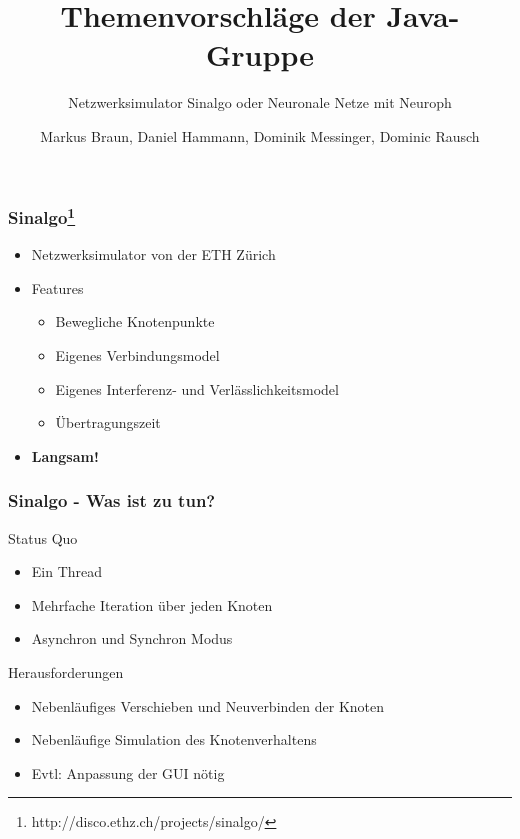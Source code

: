\documentclass[18pt]{beamer}
\title{Themenvorschläge der Java-Gruppe}
\subtitle{Netzwerksimulator Sinalgo oder Neuronale Netze mit Neuroph}
\author{Markus Braun, Daniel Hammann, Dominik Messinger, Dominic Rausch}
\institute{Institut für Programmstrukturen und Datenorganisation (IPD), Lehrstuhl für Programmiersysteme}
\begin{document}
	\maketitle

	\begin{frame}[c]\frametitle{Sinalgo\footnote{http://disco.ethz.ch/projects/sinalgo/} }
		\begin{block}{}
			\begin{itemize}
			\item Netzwerksimulator von der ETH Zürich
			\item Features
			\begin{itemize}
				\item Bewegliche Knotenpunkte
				\item Eigenes Verbindungsmodel
				\item Eigenes Interferenz- und Verlässlichkeitsmodel
				\item Übertragungszeit
			\end{itemize}
			\item \textbf{Langsam!}
			\end{itemize}
		\end{block}
	\end{frame}

	\begin{frame}[c]\frametitle{Sinalgo - Was ist zu tun?}
		\begin{block}{Status Quo}
		    \begin{itemize}
		    	\item Ein Thread
		    	\item Mehrfache Iteration über jeden Knoten
		    	\item Asynchron und Synchron Modus
		    \end{itemize}
		\end{block}
		\begin{block}{Herausforderungen}
			\begin{itemize}
		    	\item Nebenläufiges Verschieben und Neuverbinden der Knoten
		    	\item Nebenläufige Simulation des Knotenverhaltens
		    	\item Evtl: Anpassung der GUI nötig
		    \end{itemize}
		\end{block}
	\end{frame}
	
\end{document}
